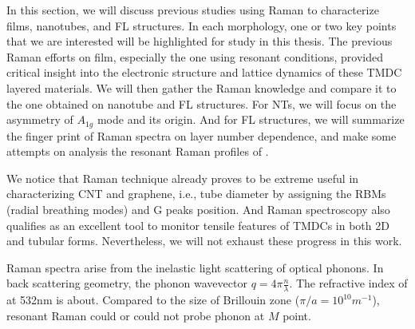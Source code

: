 In this section, we will discuss previous studies using Raman to characterize  films, nanotubes, and FL structures. In each morphology, one or two key points that we are interested will be highlighted for study in this thesis. The previous Raman efforts on  film, especially the one using resonant conditions, provided critical insight into the electronic structure and lattice dynamics of these TMDC layered materials. We will then gather the Raman knowledge and compare it to the one obtained on nanotube and FL structures. For  NTs, we will focus on the asymmetry of $A_{1g}$ mode and its origin. And for  FL structures, we will summarize the finger print of Raman spectra on layer number dependence, and make some attempts on analysis the resonant Raman profiles of .

We notice that Raman technique already proves to be extreme useful in characterizing CNT and graphene, i.e., tube diameter by assigning the RBMs (radial breathing modes) and G peaks position.\cite{Bonaccorso2013} And Raman spectroscopy also qualifies as an excellent tool to monitor tensile features of TMDCs in both 2D and tubular forms.\cite{Tang2013} Nevertheless, we will not exhaust these progress in this work.

Raman spectra arise from the inelastic light scattering of optical phonons. In back scattering geometry, the phonon wavevector
$q = 4\pi\frac{n}{\lambda}$. The refractive index of  at 532nm is about. Compared to the size of Brillouin zone ($\pi/a = 10^{10}m^{-1}$), resonant Raman could or could not probe phonon at $M$ point.

